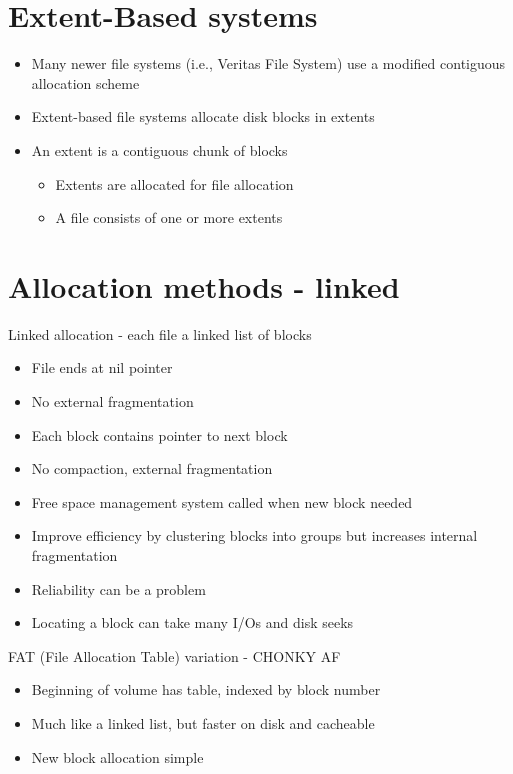 \documentclass{article}[18pt]
\begin{document}
\section{Extent-Based systems}
\begin{itemize}
	\item Many newer file systems (i.e., Veritas File System) use a modified contiguous allocation scheme
	\item Extent-based file systems allocate disk blocks in extents
	\item An extent is a contiguous chunk of blocks
	\begin{itemize}
		\item Extents are allocated for file allocation
		\item A file consists of one or more extents
	\end{itemize}
\end{itemize}
\section{Allocation methods - linked}
Linked allocation - each file a linked list of blocks
\begin{itemize}
	\item File ends at nil pointer
	\item No external fragmentation
	\item Each block contains pointer to next block
	\item No compaction, external fragmentation
	\item Free space management system called when new block needed
	\item Improve efficiency by clustering blocks into groups but increases internal fragmentation
	\item Reliability can be a problem
	\item Locating a block can take many I/Os and disk seeks
\end{itemize}
FAT (File Allocation Table) variation - CHONKY AF
\begin{itemize}
	\item Beginning of volume has table, indexed by block number
	\item Much like a linked list, but faster on disk and cacheable
	\item New block allocation simple
\end{itemize}
\end{document}
